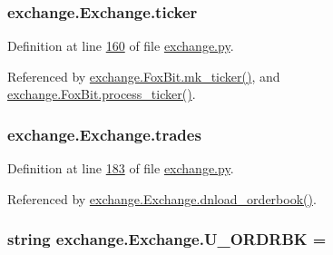\subsubsection[{\texorpdfstring{ticker}{ticker}}]{\setlength{\rightskip}{0pt plus 5cm}exchange.\+Exchange.\+ticker}\hypertarget{classexchange_1_1_exchange_a7cf9e52f993627955a2e242c388daaeb}{}\label{classexchange_1_1_exchange_a7cf9e52f993627955a2e242c388daaeb}


Definition at line \hyperlink{exchange_8py_source_l00160}{160} of file \hyperlink{exchange_8py_source}{exchange.\+py}.



Referenced by \hyperlink{exchange_8py_source_l00482}{exchange.\+Fox\+Bit.\+mk\+\_\+ticker()}, and \hyperlink{exchange_8py_source_l00461}{exchange.\+Fox\+Bit.\+process\+\_\+ticker()}.

\subsubsection[{\texorpdfstring{trades}{trades}}]{\setlength{\rightskip}{0pt plus 5cm}exchange.\+Exchange.\+trades}\hypertarget{classexchange_1_1_exchange_a30e87a377320ce05bd956fb014683641}{}\label{classexchange_1_1_exchange_a30e87a377320ce05bd956fb014683641}


Definition at line \hyperlink{exchange_8py_source_l00183}{183} of file \hyperlink{exchange_8py_source}{exchange.\+py}.



Referenced by \hyperlink{exchange_8py_source_l00194}{exchange.\+Exchange.\+dnload\+\_\+orderbook()}.

\subsubsection[{\texorpdfstring{U\+\_\+\+O\+R\+D\+R\+BK}{U_ORDRBK}}]{\setlength{\rightskip}{0pt plus 5cm}string exchange.\+Exchange.\+U\+\_\+\+O\+R\+D\+R\+BK = \textquotesingle{}\textquotesingle{}\hspace{0.3cm}{\ttfamily [static]}}\hypertarget{classexchange_1_1_exchange_a83174d2fe96a1c737231d3b8b18d9807}{}\label{classexchange_1_1_exchange_a83174d2fe96a1c737231d3b8b18d9807}


